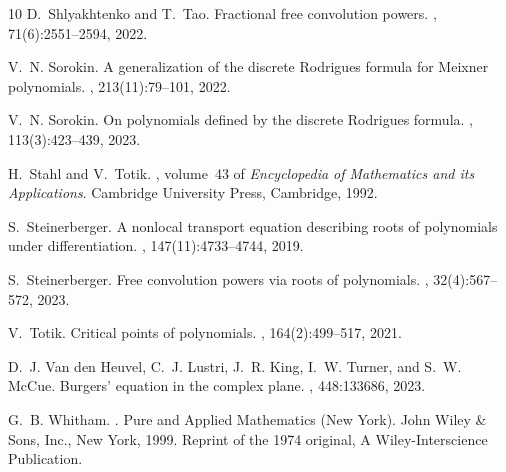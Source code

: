 \documentclass[reqno,11pt]{amsart}
\theoremstyle{plain}
\theoremstyle{definition}
\theoremstyle{remark}
\numberwithin{equation}{section}
\numberwithin{equation}{section}
\begin{document}
\begin{thebibliography}{10}
	D.~Shlyakhtenko and T.~Tao.
	\newblock Fractional free convolution powers.
	, 71(6):2551--2594, 2022.
	
	V.~N. Sorokin.
	\newblock A generalization of the discrete {R}odrigues formula for {M}eixner
	polynomials.
	, 213(11):79--101, 2022.
	
	V.~N. Sorokin.
	\newblock On polynomials defined by the discrete {R}odrigues formula.
	, 113(3):423--439, 2023.
	
	H.~Stahl and V.~Totik.
	, volume~43 of {\em Encyclopedia
		of Mathematics and its Applications}.
	\newblock Cambridge University Press, Cambridge, 1992.
	
	S.~Steinerberger.
	\newblock A nonlocal transport equation describing roots of polynomials under
	differentiation.
	, 147(11):4733--4744, 2019.
	
	S.~Steinerberger.
	\newblock Free convolution powers via roots of polynomials.
	, 32(4):567--572, 2023.
	
	V.~Totik.
	\newblock Critical points of polynomials.
	, 164(2):499--517, 2021.
	
	D.~J. Van den Heuvel, C.~J. Lustri, J.~R. King, I.~W. Turner, and S.~W. McCue.
	\newblock Burgers' equation in the complex plane.
	, 448:133686, 2023.
	
	G.~B. Whitham.
	.
	\newblock Pure and Applied Mathematics (New York). John Wiley \& Sons, Inc.,
	New York, 1999.
	\newblock Reprint of the 1974 original, A Wiley-Interscience Publication.
	
\end{thebibliography}
\end{document}
